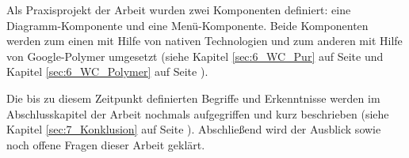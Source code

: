 Als Praxisprojekt der Arbeit wurden zwei Komponenten definiert: eine Diagramm-Komponente und eine Menü-Komponente. Beide Komponenten werden zum einen mit Hilfe von nativen Technologien und zum anderen mit Hilfe von Google-Polymer umgesetzt (siehe Kapitel \ref{sec:6_WC_Pur} auf Seite \pageref{sec:6_WC_Pur} und Kapitel \ref{sec:6_WC_Polymer} auf Seite \pageref{sec:6_WC_Polymer}).

Die bis zu diesem Zeitpunkt definierten Begriffe und Erkenntnisse werden im Abschlusskapitel der Arbeit nochmals aufgegriffen und kurz beschrieben (siehe Kapitel \ref{sec:7_Konklusion} auf Seite \pageref{sec:7_Konklusion}). Abschließend wird der Ausblick sowie noch offene Fragen dieser Arbeit geklärt.